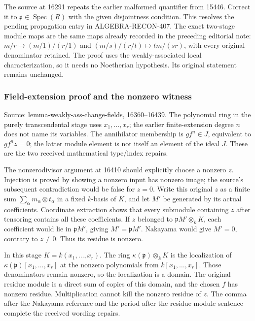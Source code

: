 The source at 16291 repeats the earlier malformed quantifier from 15446. Correct it to \(\mathfrak p\in\operatorname{Spec}(R)\) with the given disjointness condition. This resolves the pending propagation entry in ALGEBRA-RECON-407. The exact two-stage module maps are the same maps already recorded in the preceding editorial note: \(m/r\mapsto(m/1)/(r/1)\) and \((m/s)/(r/t)\mapsto tm/(sr)\), with every original denominator retained. The proof uses the weakly-associated local characterization, so it needs no Noetherian hypothesis. Its original statement remains unchanged.

\subsubsection{Field-extension proof and the nonzero witness}\label{algebra-proof-005-field-extension-proof-and-the-nonzero-witness}

Source: lemma-weakly-ass-change-fields, 16360--16439. The polynomial ring in the purely transcendental stage uses \(x_1,\ldots,x_r\); the earlier finite-extension degree \(n\) does not name its variables. The annihilator membership is \(gf^n\in J\), equivalent to \(gf^nz=0\); the latter module element is not itself an element of the ideal \(J\). These are the two received mathematical type/index repairs.

The nonzerodivisor argument at 16410 should explicitly choose a nonzero \(z\). Injection is proved by showing a nonzero input has nonzero image; the source's subsequent contradiction would be false for \(z=0\). Write this original \(z\) as a finite sum \(\sum_\alpha m_\alpha\otimes t_\alpha\) in a fixed \(k\)-basis of \(K\), and let \(M'\) be generated by its actual coefficients. Coordinate extraction shows that every submodule containing \(z\) after tensoring contains all these coefficients. If \(z\) belonged to \(\mathfrak pM'\otimes_kK\), each coefficient would lie in \(\mathfrak pM'\), giving \(M'=\mathfrak pM'\). Nakayama would give \(M'=0\), contrary to \(z\ne0\). Thus its residue is nonzero.

In this stage \(K=k(x_1,\ldots,x_r)\). The ring \(\kappa(\mathfrak p)\otimes_kK\) is the localization of \(\kappa(\mathfrak p)[x_1,\ldots,x_r]\) at the nonzero polynomials from \(k[x_1,\ldots,x_r]\). Those denominators remain nonzero, so the localization is a domain. The original residue module is a direct sum of copies of this domain, and the chosen \(f\) has nonzero residue. Multiplication cannot kill the nonzero residue of \(z\). The comma after the Nakayama reference and the period after the residue-module sentence complete the received wording repairs.

